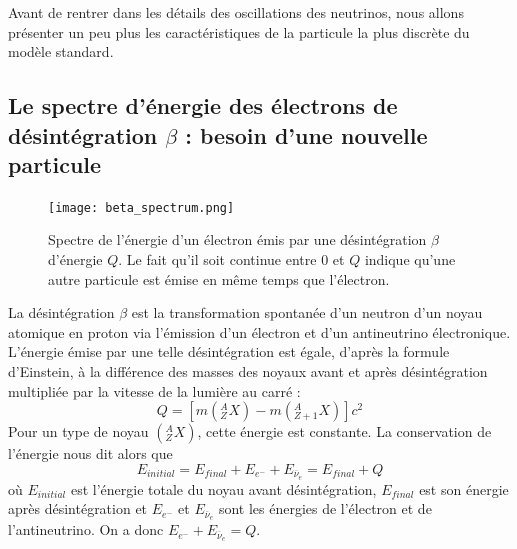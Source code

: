 		    Avant de rentrer dans les détails des oscillations des neutrinos, nous allons présenter un peu plus les caractéristiques de la particule la plus discrète du modèle standard.
		    		    
    
        \subsection{Le spectre d'énergie des électrons de désintégration \texorpdfstring{$\beta$}{b} : besoin d'une nouvelle particule}\label{sec::neutrino_origin}
        
	        \begin{figure}
	        	\texttt{[image: beta\_spectrum.png]}
	        	\caption[Spectre de désintégration $\beta$.]{\label{fig::beta_spectrum}Spectre de l'énergie d'un électron émis par une désintégration $\beta$ d'énergie $Q$. Le fait qu'il soit continue entre 0 et $Q$ indique qu'une autre particule est émise en même temps que l'électron.}
	        \end{figure}
	        La désintégration $\beta$ est la transformation spontanée d'un neutron d'un noyau atomique en proton via l'émission d'un électron et d'un antineutrino électronique. L'énergie émise par une telle désintégration est égale, d'après la formule d'Einstein, à la différence des masses des noyaux avant et après désintégration multipliée par la vitesse de la lumière au carré : 
	        \begin{equation}
	        	Q = \left[m\left(^A_Z X\right)-m\left(^A_{Z+1} X\right)\right]c^2
	        \end{equation}
	        Pour un type de noyau $\left(^A_Z X\right)$, cette énergie est constante. La conservation de l'énergie nous dit alors que
	        \begin{equation}
	        	E_{initial} = E_{final} +E_{e^-}+E_{\overline{\nu}_e} = E_{final}+Q
	        \end{equation}
	        où $E_{initial}$ est l'énergie totale du noyau avant désintégration, $E_{final}$ est son énergie après désintégration et $E_{e^-}$ et $E_{\overline{\nu}_e}$ sont les énergies de l'électron et de l'antineutrino. On a donc $E_{e^-}+E_{\overline{\nu}_e} = Q$.
	        
